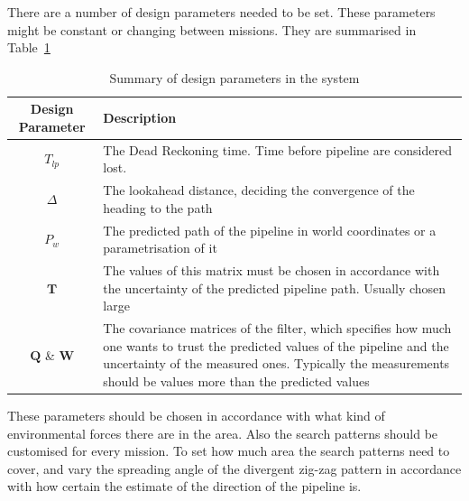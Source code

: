	There are a number of design parameters needed to be set. These parameters might be constant or
	changing between missions. They are summarised in Table~\ref{tab:ch2-design-param}
	\begin{table}[htbp]
		\centering
		\begin{tabular}{| c | p{6cm} |}
			\hline
			Design Parameter 	& 	Description \\
			\hline
			\hline
			$T_{lp}$ 		&	The Dead Reckoning time. Time before pipeline are
							considered lost. \\
			\hline
			$\Delta$		&	The lookahead distance, deciding the convergence of
							the heading to the path \\
			\hline
			$P_w$			& 	The predicted path of the pipeline in world
							coordinates or a parametrisation of it \\
			\hline
			$\mathbf{T}$		&	The values of this matrix must be chosen in accordance
							with the uncertainty of the predicted pipeline path.
							Usually chosen large \\
			\hline
			$\mathbf{Q}$ \& $\mathbf{W}$ & 	The covariance matrices of the filter, which specifies how much
							one wants to trust the predicted values of the pipeline and the
							uncertainty of the measured ones. Typically the measurements 
							should be values more than the predicted values\\
			\hline
		\end{tabular}
		\caption{Summary of design parameters in the system}
		\label{tab:ch2-design-param}
	\end{table}
	These parameters should be chosen in accordance with what kind of environmental forces there are in
	the area. Also the search patterns should be customised for every mission. To set how much area the search
	patterns need to cover, and vary the spreading angle of the divergent zig-zag pattern in accordance with how
	certain the estimate of the direction of the pipeline is.
	

